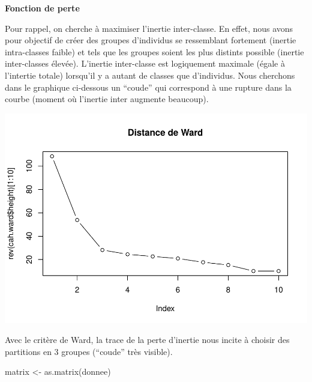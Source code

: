 \documentclass[
]{article}
\newenvironment{Shaded}{}{}
\newcommand{\AttributeTok}[1]{#1}
\newcommand{\DecValTok}[1]{#1}
\newcommand{\FunctionTok}[1]{#1}
\newcommand{\NormalTok}[1]{#1}
\newcommand{\OtherTok}[1]{\textcolor[rgb]{1.00,0.25,0.00}{#1}}
\newcommand{\SpecialCharTok}[1]{\textcolor[rgb]{0.00,0.50,0.50}{#1}}
\newcommand{\StringTok}[1]{\textcolor[rgb]{0.00,0.50,0.50}{#1}}
\begin{document}
\textbf{Fonction de perte}

Pour rappel, on cherche à maximiser l'inertie inter-classe. En effet,
nous avons pour objectif de créer des groupes d'individus se ressemblant
fortement (inertie intra-classes faible) et tels que les groupes soient
les plus distints possible (inertie inter-classes élevée). L'inertie
inter-classe est logiquement maximale (égale à l'intertie totale)
lorsqu'il y a autant de classes que d'individus. Nous cherchons dans le
graphique ci-dessous un ``coude'' qui correspond à une rupture dans la
courbe (moment où l'inertie inter augmente beaucoup).

\begin{Shaded}
\end{Shaded}

\includegraphics{Projet_files/figure-latex/unnamed-chunk-15-1.pdf}

Avec le critère de Ward, la trace de la perte d'inertie nous incite à
choisir des partitions en 3 groupes (``coude'' très visible).

\begin{Shaded}
\begin{Highlighting}[]
\NormalTok{matrix }\OtherTok{\textless{}{-}} \FunctionTok{as.matrix}\NormalTok{(donnee)}
\end{Highlighting}
\end{Shaded}
\end{document}
